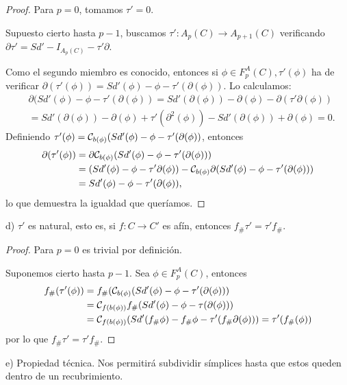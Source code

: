 \begin{proof}
  Para $p = 0$, tomamos $\tau' = 0$.

  Supuesto cierto hasta $p-1$, buscamos $\tau' \colon A_p(C) \to A_{p+1}(C)$ verificando $\partial \tau' = Sd' - I_{A_p(C)} - \tau' \partial$.

  Como el segundo miembro es conocido, entonces si $\phi \in F_p^A(C), \tau'(\phi)$ ha de verificar
  $\partial(\tau'(\phi)) = Sd'(\phi) - \phi - \tau'(\partial(\phi))$. Lo calculamos:
  \begin{align*}
    &\partial(Sd'(\phi) - \phi - \tau'(\partial(\phi)) = Sd'(\partial(\phi)) - \partial(\phi) - \partial(\tau' \partial(\phi)) \\
    &= Sd'(\partial(\phi)) - \partial(\phi) + \tau'(\partial^2(\phi)) - Sd'(\partial(\phi)) + \partial(\phi) = 0.
  \end{align*}
  Definiendo $\tau'(\phi) = {\mathcal C}_{b(\phi)}(Sd'(\phi) - \phi - \tau'(\partial(\phi))$, entonces
  \begin{align*}
    \partial(\tau'(\phi)) &= \partial {\mathcal C}_{b(\phi)}(Sd'(\phi) - \phi -\tau'(\partial(\phi))) \\
    &= (Sd'(\phi) - \phi - \tau' \partial(\phi)) - {\mathcal C}_{b(\phi)} \partial(Sd'(\phi) - \phi - \tau'(\partial(\phi))) \\
    &= Sd'(\phi) - \phi - \tau'(\partial(\phi)),
  \end{align*}
  lo que demuestra la igualdad que queríamos.
\end{proof}

d) $\tau'$ es natural, esto es, si $f \colon C \to C'$ es afín, entonces $f_\# \tau' = \tau' f_\#$.

\begin{proof}
  Para $p = 0$ es trivial por definición.

  Suponemos cierto hasta $p-1$. Sea $\phi \in F_p^A(C)$, entonces
  \begin{align*}
    f_\#(\tau'(\phi)) &= f_\#({\mathcal C}_{b(\phi)}(Sd'(\phi) - \phi - \tau'(\partial(\phi))) \\
    &= {\mathcal C}_{f(b(\phi))} f_\#(Sd'(\phi) - \phi - \tau(\partial(\phi))) \\
    &= {\mathcal C}_{f(b(\phi))}(Sd'(f_\# \phi) - f_\# \phi - \tau'(f_\# \partial(\phi))) = \tau'(f_\#(\phi))
  \end{align*}
  por lo que $f_\# \tau' = \tau' f_\#$.
\end{proof}

e) Propiedad técnica. Nos permitirá subdividir símplices hasta que estos queden dentro de un recubrimiento.

